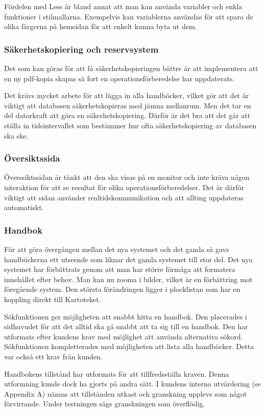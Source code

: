 \documentclass{article}
\begin{document}
Fördelen med Less är bland annat att man kan använda variabler och enkla funktioner i stilmallarna.
Exempelvis kan variablerna användas för att spara de olika färgerna på hemsidan för att enkelt kunna byta ut dem.

\subsubsection{Säkerhetskopiering och reservsystem}
Det som kan göras för att få säkerhetskopieringen bättre är att implementera att en ny pdf-kopia skapas så fort en operationsförberedelse har uppdaterats.

Det krävs mycket arbete för att lägga in alla handböcker, vilket gör att det är viktigt att databasen säkerhetskopieras med jämna mellanrum. Men det tar en del datorkraft att göra en säkerhetskopiering. Därför är det bra att det går att ställa in tidsintervallet som bestämmer hur ofta säkerhetskopiering av databasen ska ske.

\subsubsection{Översiktssida}
Överssiktssidan är tänkt att den ska visas på en monitor och inte kräva någon interaktion för att se resultat för olika operationsförberedelser. Det är därför viktigt att sidan använder realtidskommunikation och att allting uppdateras automatiskt. 

\subsubsection{Handbok}
För att göra övergången mellan det nya systemet och det gamla så gavs handböckerna ett utseende som liknar det gamla systemet till stor del. Det nya systemet har förbättrats genom att man har större förmåga att formatera innehållet efter behov. Man kan nu zooma i bilder, vilket är en förbättring mot föregående system.
Den största förändringen ligger i plocklistan som har en koppling direkt till Kartoteket.

Sökfunktionen ger möjligheten att snabbt hitta en handbok. Den placerades i sidhuvudet för att det alltid ska gå snabbt att ta sig till en handbok. Den har utformats efter kundens krav med möjlighet att använda alternativa sökord.
Sökfunktionen kompletterades med möjligheten att lista alla handböcker. Detta var också ett krav från kunden. 

Handbokens tillstånd har utformats för att tillfredsställa kraven. Denna utformning kunde dock ha gjorts på andra sätt. I kundens interna utvärdering (se Appendix A) nämns att tillstånden utkast och granskning upplevs som något förvirrande. Under testningen sågs granskningen som överflödig.
\end{document}
